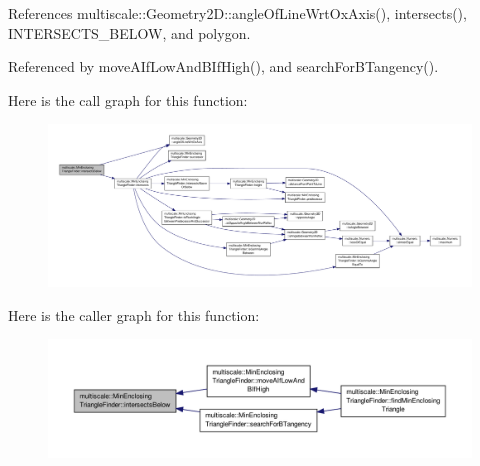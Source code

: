 References multiscale\-::\-Geometry2\-D\-::angle\-Of\-Line\-Wrt\-Ox\-Axis(), intersects(), I\-N\-T\-E\-R\-S\-E\-C\-T\-S\-\_\-\-B\-E\-L\-O\-W, and polygon.



Referenced by move\-A\-If\-Low\-And\-B\-If\-High(), and search\-For\-B\-Tangency().



Here is the call graph for this function\-:\nopagebreak
\begin{figure}[H]
\begin{center}
\leavevmode
\includegraphics[width=350pt]{classmultiscale_1_1MinEnclosingTriangleFinder_a0abe1c7d5ef5a43f8ea1b404db0066e0_cgraph}
\end{center}
\end{figure}




Here is the caller graph for this function\-:\nopagebreak
\begin{figure}[H]
\begin{center}
\leavevmode
\includegraphics[width=350pt]{classmultiscale_1_1MinEnclosingTriangleFinder_a0abe1c7d5ef5a43f8ea1b404db0066e0_icgraph}
\end{center}
\end{figure}


